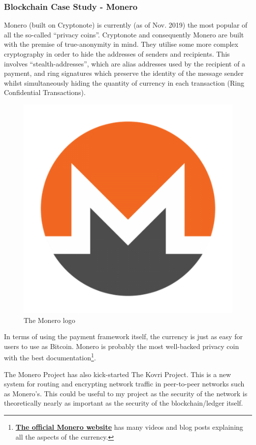 \documentclass{article}
\begin{document}
\newpage

\subsubsection{Blockchain Case Study - Monero}
Monero (built on Cryptonote\cite{cryptonote_paper}) is currently (as of Nov. 2019) the most popular of all the so-called ``privacy coins''. Cryptonote and consequently Monero are built with the premise of true-anonymity in mind. They utilise some more complex cryptography in order to hide the addresses of senders and recipients. This involves ``stealth-addresses'', which are alias addresses used by the recipient of a payment, and ring signatures which preserve the identity of the message sender whilst simultaneously hiding the quantity of currency in each transaction (Ring Confidential Transactions).
\begin{figure}[h]
    \centering
    \includegraphics[width=0.4\linewidth]{Images/monerologo.png}
    \caption{The Monero logo}
    \label{fig:monerologo}
\end{figure}
In terms of using the payment framework itself, the currency is just as easy for users to use as Bitcoin. Monero is probably the most well-backed privacy coin with the best documentation\footnote{\hyperlink{GetMonero.org}{\textbf{The official Monero website}} has many videos and blog posts explaining all the aspects of the currency.}.

The Monero Project has also kick-started The Kovri Project\cite{kovri_repo}. This is a new system for routing and encrypting network traffic in peer-to-peer networks such as Monero's. This could be useful to my project as the security of the network is theoretically nearly as important as the security of the blockchain/ledger itself.
\end{document}
